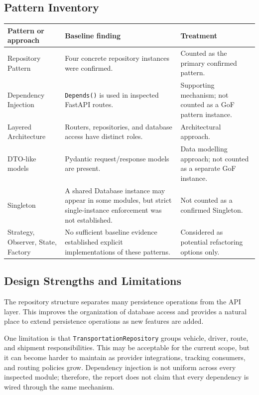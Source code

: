 \documentclass[12pt,a4paper]{article}
\begin{document}
\subsection{Pattern Inventory}
\begin{longtable}{p{}p{}p{}}
\toprule
\textbf{Pattern or approach} & \textbf{Baseline finding} & \textbf{Treatment}\\
\midrule
Repository Pattern & Four concrete repository instances were confirmed. & Counted as the primary confirmed pattern.\\
Dependency Injection & \texttt{Depends()} is used in inspected FastAPI routes. & Supporting mechanism; not counted as a GoF pattern instance.\\
Layered Architecture & Routers, repositories, and database access have distinct roles. & Architectural approach.\\
DTO-like models & Pydantic request/response models are present. & Data modelling approach; not counted as a separate GoF instance.\\
Singleton & A shared Database instance may appear in some modules, but strict single-instance enforcement was not established. & Not counted as a confirmed Singleton.\\
Strategy, Observer, State, Factory & No sufficient baseline evidence established explicit implementations of these patterns. & Considered as potential refactoring options only.\\
\bottomrule
\end{longtable}

\subsection{Design Strengths and Limitations}
The repository structure separates many persistence operations from the API layer. This improves the organization of database access and provides a natural place to extend persistence operations as new features are added.

One limitation is that \texttt{TransportationRepository} groups vehicle, driver, route, and shipment responsibilities. This may be acceptable for the current scope, but it can become harder to maintain as provider integrations, tracking consumers, and routing policies grow. Dependency injection is not uniform across every inspected module; therefore, the report does not claim that every dependency is wired through the same mechanism.
\end{document}
